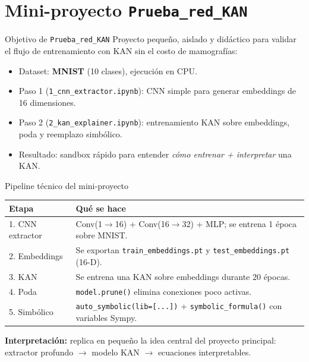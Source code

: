 \documentclass[aspectratio=169,spanish]{beamer}
\begin{document}
\section{Mini-proyecto \texttt{Prueba\_red\_KAN}}

\begin{frame}{Objetivo de \texttt{Prueba\_red\_KAN}}
  \small
  Proyecto pequeño, aislado y didáctico para validar el flujo de entrenamiento con KAN sin el costo de mamografías:
  \begin{itemize}
    \item Dataset: \textbf{MNIST} (10 clases), ejecución en CPU.
    \item Paso 1 (\texttt{1\_cnn\_extractor.ipynb}): CNN simple para generar embeddings de 16 dimensiones.
    \item Paso 2 (\texttt{2\_kan\_explainer.ipynb}): entrenamiento KAN sobre embeddings, poda y reemplazo simbólico.
    \item Resultado: sandbox rápido para entender \emph{cómo entrenar + interpretar} una KAN.
  \end{itemize}
\end{frame}

\begin{frame}{Pipeline técnico del mini-proyecto}
  \small
  \begin{tabular}{@{}lp{8.4cm}@{}}
    \toprule
    Etapa & Qué se hace \\
    \midrule
    1. CNN extractor & Conv(1$\to$16) + Conv(16$\to$32) + MLP; se entrena 1 época sobre MNIST. \\
    2. Embeddings & Se exportan \texttt{train\_embeddings.pt} y \texttt{test\_embeddings.pt} (16-D). \\
    3. KAN & Se entrena una KAN sobre embeddings durante 20 épocas. \\
    4. Poda & \texttt{model.prune()} elimina conexiones poco activas. \\
    5. Simbólico & \texttt{auto\_symbolic(lib=[...])} + \texttt{symbolic\_formula()} con variables Sympy. \\
    \bottomrule
  \end{tabular}

  \vspace{0.6em}
  \textbf{Interpretación:} replica en pequeño la idea central del proyecto principal:
  extractor profundo $\rightarrow$ modelo KAN $\rightarrow$ ecuaciones interpretables.
\end{frame}
\end{document}
